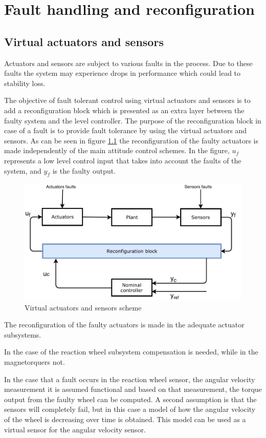 \chapter{Fault handling and reconfiguration}  \label{chap:faltHandling}
 \section{Virtual actuators and sensors} \label{chap: virtual}
 Actuators and sensors are subject to various faults in the process. Due to these faults the system may experience drops in performance which could lead to stability loss.
 
 The objective of fault tolerant control using virtual actuators and sensors is to add a reconfiguration block which is presented as an extra layer between the faulty system and the level controller. The purpose of the reconfiguration block in case of a fault is to provide fault tolerance by using the virtual actuators and sensors. As can be seen in figure \ref{fig:VA} the reconfiguration of the faulty actuators is made independently of the main attitude control schemes.  In the figure, $u_f$ represents a low level control input that takes into account the faults of the system, and $y_f$ is the faulty output. 
 \begin{figure}[H]
 	\centering
 	\includegraphics[width=0.8\linewidth]{figures/VirtualActuator}
 	\caption{ Virtual actuators and sensors scheme}
 	\label{fig:VA}
 \end{figure}
 
 The reconfiguration of the faulty actuators is made in the adequate actuator subsystems. 
 
 In the case of the reaction wheel subsystem compensation is needed, while in the magnetorquers not.
 
 In the case that a fault occurs in the reaction wheel sensor, the angular velocity measurement it is assumed functional and based on that measurement, the torque output from the faulty wheel can be computed. A second assumption is that the sensors will completely fail, but in this case a model of how the angular velocity of the wheel is decreasing over time is obtained. This model can be used as a virtual sensor for the angular velocity sensor. 
 

